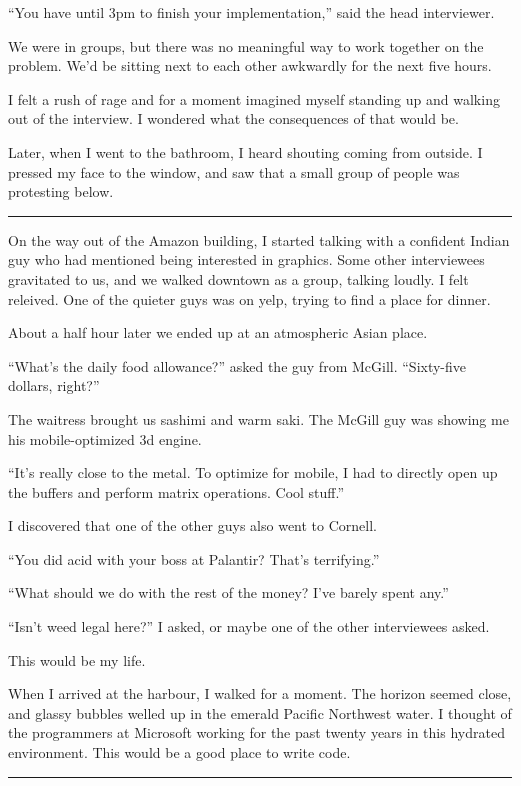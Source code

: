``You have until 3pm to finish your implementation,'' said the head interviewer.

We were in groups, but there was no meaningful way to work together on the
problem.  We'd be sitting next to each other awkwardly for the next five hours.

I felt a rush of rage and for a moment imagined myself standing up and walking
out of the interview.  I wondered what the consequences of that would be.  

Later, when I went to the bathroom, I heard shouting coming from outside.  I
pressed my face to the window, and saw that a small group of people was
protesting below.

\plainfancybreak{12pt}{2}{* * *}

On the way out of the Amazon building, I started talking with a confident Indian
guy who had mentioned being interested in graphics.  Some other interviewees
gravitated to us, and we walked downtown as a group, talking loudly.  I felt
releived.  One of the quieter guys was on yelp, trying to find a place for
dinner.

About a half hour later we ended up at an atmospheric Asian place.

``What's the daily food allowance?'' asked the guy from McGill. ``Sixty-five
dollars, right?''

The waitress brought us sashimi and warm saki.  The McGill guy was showing me
his mobile-optimized 3d engine.

``It's really close to the metal.  To optimize for mobile, I had to directly
open up the buffers and perform matrix operations.  Cool stuff.''

I discovered that one of the other guys also went to Cornell.  

``You did acid with your boss at Palantir?  That's terrifying.''

``What should we do with the rest of the money?  I've barely spent any.''

``Isn't weed legal here?'' I asked, or maybe one of the other interviewees
asked.


This would be my life.


When I arrived at the harbour, I walked for a moment.  The horizon seemed close,
and glassy bubbles welled up in the emerald Pacific Northwest water.  I thought
of the programmers at Microsoft working for the past twenty years in this
hydrated environment.  This would be a good place to write code.

\plainfancybreak{12pt}{2}{* * *}


